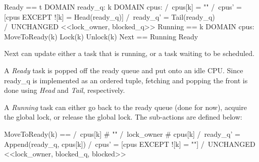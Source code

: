 \begin{tla}
Ready == 
    \E t \in DOMAIN ready_q:
        \E k \in DOMAIN cpus:
        /\ cpus[k] = "" 
        /\ cpus' = [cpus EXCEPT ![k] = Head(ready_q)]
        /\ ready_q' = Tail(ready_q)
        /\ UNCHANGED <<lock_owner, blocked_q>>
Running == 
    \E k \in DOMAIN cpus:
        \/ MoveToReady(k)
        \/ Lock(k)
        \/ Unlock(k)
Next == 
    \/ Running
    \/ Ready
\end{tla}
\begin{tlatex}
%
%
%
%
%
%
%
%
%
%
%
%
%
\end{tlatex}
\newline

Next can update either a task that is running, or a task waiting to be
scheduled.\newline

A \textit{Ready} task is popped off the ready queue and put onto an idle CPU.
Since ready\_q is implemented as an ordered tuple, fetching and popping the
front is done using \textit{Head} and \textit{Tail}, respectively.\newline

A \textit{Running} task can either go back to the ready queue (done for now),
acquire the global lock, or release the global lock.  The sub-actions are
defined below:\newline

\begin{tla}
MoveToReady(k) == 
    /\ cpus[k] # "" 
    /\ lock_owner # cpus[k]
    /\ ready_q' = Append(ready_q, cpus[k]) 
    /\ cpus' = [cpus EXCEPT ![k] = ""]
    /\ UNCHANGED <<lock_owner, blocked_q, blocked>>
\end{tla}
\begin{tlatex}
%
%
%
\end{tlatex}
\newline

